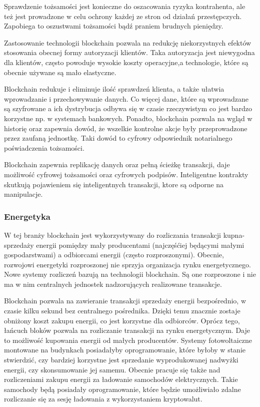 \documentclass[12pt]{article}
\begin{document}
Sprawdzenie tożsamości jest konieczne do oszacowania ryzyka kontrahenta, ale też jest prowadzone w celu ochrony każdej ze stron od działań przestępczych. Zapobiega to oszustwami tożsamości bądź praniem brudnych pieniędzy.

Zastosowanie technologii blockchain pozwala na redukcję niekorzystnych efektów stosowania obecnej formy autoryzacji klientów. Taka autoryzacja jest niewygodna dla klientów, często powoduje wysokie koszty operacyjne,a technologie, które są obecnie używane są mało elastyczne.

Blockchain redukuje i eliminuje ilość sprawdzeń klienta, a także ułatwia wprowadzanie i przechowywanie danych. Co więcej dane, które są wprowadzane są szyfrowane a ich dystrybucja odbywa się w czasie rzeczywistym co jest bardzo korzystne np. w systemach bankowych. Ponadto, blockchain pozwala na wgląd w historię oraz zapewnia dowód, że wszelkie kontrolne akcje były przeprowadzone przez zaufaną jednostkę. Taki dowód to cyfrowy odpowiednik notarialnego poświadczenia tożsamości.

Blockchain zapewnia replikację danych oraz pełną ścieżkę transakcji, daje możliwość cyfrowej tożsamości oraz cyfrowych podpisów. Inteligentne kontrakty skutkują pojawieniem się inteligentnych transakcji, ktore są odporne na manipulacje.

\subsubsection{Energetyka}
W tej branży blockchain jest wykorzystywany do rozliczania transakcji kupna-sprzedaży energii pomiędzy mały producentami (najczęśćiej będącymi małymi gospodarstwami) a odbiorcami energii (często rozproszonymi).
Obecnie, rozwojowi energetyki rozproszonej nie sprzyja organizacja rynku energetycznego. Nowe systemy rozliczeń bazują na technologii blockchain. Są one rozproszone i nie ma w nim centralnych jednostek nadzorujących realizowane transakcje.

Blockchain pozwala na zawieranie transakcji sprzedaży energii bezpośrednio, w czasie kilku sekund bez centralnego pośrednika. Dzięki temu znacznie zostaje obniżony koszt zakupu energii, co jest korzystne dla odbiorców.
Oprócz tego, łańcuch bloków pozwala na rozliczanie transakcji na rynku energetycznym. Daje to możliwość kupowania energii od małych producentów.
Systemy fotowoltaiczne montowane na budynkach posiadałyby oprogramowanie, które byłoby w stanie stwierdzić, czy bardziej korzystne jest sprzedanie wyprodukowanej nadwyżki energii, czy skonsumowanie jej samemu. 
Obecnie pracuje się także nad rozliczeniami zakupu energii za ładowanie samochodów elektrycznych. Takie samochody będą posiadały oprogramowanie, które będzie umożliwiało zdalne rozliczanie się za sesję ładowania z wykorzystaniem kryptowalut.
\end{document}
